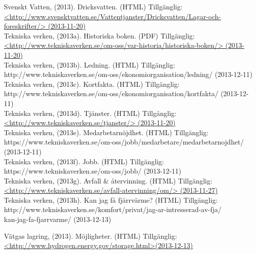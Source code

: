 \documentclass[10pt,a4paper]{article}
\begin{document}
Svenskt Vatten, (2013). Dricksvatten. (HTML) Tillgänglig: \\
\hyperref{http://www.svensktvatten.se/Vattentjanster/Dricksvatten/Lagar-och-foreskrifter/}{}{}{<http://www.svensktvatten.se/Vattentjanster/Dricksvatten/Lagar-och-foreskrifter/>
(2013-11-20)} \\

Tekniska verken, (2013a). Historiska boken. (PDF) Tillgänglig: \\
\hyperref{http://www.tekniskaverken.se/om-oss/var-historia/historiska-boken/}{}{}{<http://www.tekniskaverken.se/om-oss/var-historia/historiska-boken/> (2013-11-20)}\\

Tekniska verken, (2013b). Ledning. (HTML) Tillgänglig: \\
http://www.tekniskaverken.se/om-oss/ekonomiorganisation/ledning/ (2013-12-11)\\

Tekniska verken, (2013c). Kortfakta. (HTML) Tillgänglig: \\
http://www.tekniskaverken.se/om-oss/ekonomiorganisation/kortfakta/ (2013-12-11)\\

Tekniska verken, (2013d). Tjänster. (HTML) Tillgänglig: \\
\hyperref{http://www.tekniskaverken.se/tjanster/}{}{}{<http://www.tekniskaverken.se/tjanster/>
  (2013-11-20)}\\

Tekniska verken, (2013e). Medarbetarnöjdhet. (HTML) Tillgänglig: \\
https://www.tekniskaverken.se/om-oss/jobb/medarbetare/medarbetarnojdhet/ (2013-12-11)\\

Tekniska verken, (2013f). Jobb. (HTML) Tillgänglig: \\
https://www.tekniskaverken.se/om-oss/jobb/ (2013-12-11)\\

Tekniska verken, (2013g). Avfall \& återvinning. (HTML) Tillgänglig: \\
\hyperref{http://www.tekniskaverken.se/avfall-atervinning/om/}{}{}{<http://www.tekniskaverken.se/avfall-atervinning/om/> (2013-11-27)} \\

Tekniska verken, (2013h). Kan jag få fjärrvärme? (HTML) Tillgänglig:\\ 
http://www.tekniskaverken.se/komfort/privat/jag-ar-intresserad-av-fja/\\kan-jag-fa-fjarrvarme/ (2013-12-13)

Vätgas lagring, (2013). Möjligheter. (HTML) Tillgänglig: \\
\hyperref{http://www.hydrogen.energy.gov/storage.html}{}{}{<http://www.hydrogen.energy.gov/storage.html>(2013-12-13)}\\
\end{document}
